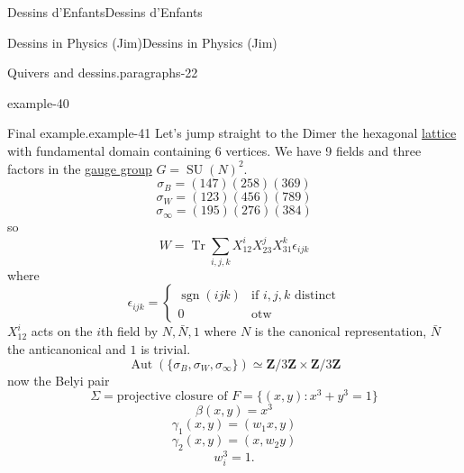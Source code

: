 \documentclass[10pt,]{book}
\numberwithin{equation}{section}
\newcommand{\ZZ}{\mathbf{Z}}
\DeclareMathOperator{\sgn}{sgn}
\DeclareMathOperator{\trace}{Tr}
\DeclareMathOperator{\Aut}{Aut}
\DeclareMathOperator{\specialunitary}{SU}
\newcommand{\amp}{&}
\begin{document}
\begin{chapterptx}{Dessins d'Enfants}{}{Dessins d'Enfants}{}{}
\begin{sectionptx}{Dessins in Physics (Jim)}{}{Dessins in Physics (Jim)}{}{}
\begin{paragraphs}{Quivers and dessins.}{paragraphs-22}
\begin{example}{}{example-40}
\end{example}
\begin{example}{Final example.}{example-41}%
\hypertarget{p-781}{}%
Let's jump straight to the Dimer the hexagonal \hyperref[def-buntes-lattice]{lattice} with fundamental domain containing 6 vertices. We have 9 fields and three factors in the \hyperref[def-gauge-transformations]{gauge group} \(G = \specialunitary (N)^2\).%
\begin{equation*}
\sigma_B = (147)(258)(369)
\end{equation*}
%
\begin{equation*}
\sigma_W = (123)(456)(789)
\end{equation*}
%
\begin{equation*}
\sigma_\infty = (195)(276)(384)
\end{equation*}
so%
\begin{equation*}
W = \trace \sum_{i,j,k} X_{12}^iX_{23}^j X_{31}^k \epsilon_{ijk}
\end{equation*}
where%
\begin{equation*}
\epsilon_{ijk} = \begin{cases} \sgn(ijk) \amp\text{if }i,j,k \text{ distinct}\\ 0 \amp\text{otw}\end{cases}
\end{equation*}
\(X_{12}^i\) acts on the \(i\)th field by \(N, \bar N, 1\) where \(N\) is the canonical representation, \(\bar N\) the anticanonical and \(1\) is trivial.%
\begin{equation*}
\Aut(\{\sigma_B,\sigma_W, \sigma_\infty\})  \simeq \ZZ/3\ZZ\times \ZZ/3\ZZ
\end{equation*}
now the Belyi pair%
\begin{equation*}
\Sigma = \text{projective closure of } F = \{(x,y) : x^3+ y^3 =1\}
\end{equation*}
%
\begin{equation*}
\beta(x,y) = x^3
\end{equation*}
%
\begin{equation*}
\gamma_1(x,y) = (w_1 x, y)
\end{equation*}
%
\begin{equation*}
\gamma_2(x,y) = (x,w_2  y)
\end{equation*}
%
\begin{equation*}
w_i^3 = 1\text{.}
\end{equation*}
%
\end{example}
\end{paragraphs}%
\end{sectionptx}
\end{chapterptx}
\end{document}
